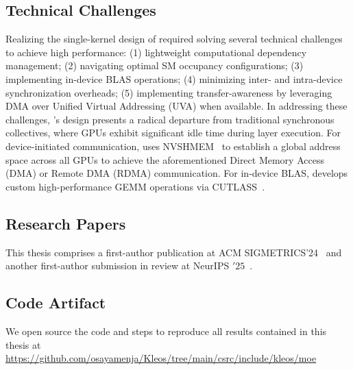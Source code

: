 \subsection{Technical Challenges}\label{subsec:technical-challenges}
Realizing the single-kernel design of \sysname required
solving several technical challenges to achieve high performance:
(1) lightweight computational dependency management; (2)
navigating optimal SM occupancy configurations; (3) implementing in-device BLAS operations;
(4) minimizing inter- and intra-device synchronization overheads; (5) implementing transfer-awareness by leveraging
DMA over Unified Virtual Addressing (UVA) when available.
In addressing these challenges, \sysname's design presents a
radical departure from traditional synchronous \alltoall collectives,
where GPUs exhibit significant idle time during layer execution.
For device-initiated communication,
\sysname uses NVSHMEM~\cite{nvshm} to establish a global address space across all GPUs to
achieve the aforementioned Direct Memory Access (DMA) or Remote DMA (RDMA) communication.
For in-device BLAS, \sysname develops custom high-performance GEMM operations via CUTLASS~\cite{Thakkar_CUTLASS_2023}.
\subsection{Research Papers}\label{subsec:research-papers}
This thesis comprises a first-author publication at ACM SIGMETRICS'24~\cite{10.1145/3725536.3725539}
and another first-author submission in review at NeurIPS \('25\)~\cite{flasharxiv}.
\subsection{Code Artifact}\label{subsec:code-artifact}
We open source the code and steps to reproduce all results contained in this thesis at
\url{https://github.com/osayamenja/Kleos/tree/main/csrc/include/kleos/moe}

